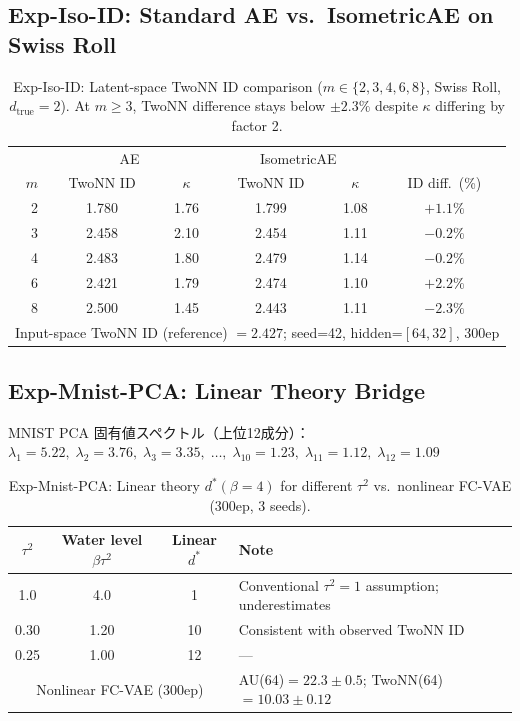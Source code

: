 \documentclass[11pt,a4paper]{jsarticle}
\newcommand{\kap}{\kappa}
\begin{document}
\subsection*{Exp-Iso-ID: Standard AE vs.\ IsometricAE on Swiss Roll}

\begin{table}[H]
\centering
\caption{Exp-Iso-ID: Latent-space TwoNN ID comparison ($m \in \{2,3,4,6,8\}$, Swiss Roll, $d_\mathrm{true}=2$). At $m \geq 3$, TwoNN difference stays below $\pm2.3\%$ despite $\kap$ differing by factor 2.}
\label{tab:iso_id}
\small
\begin{tabular}{r cc | cc | c}
\toprule
 & \multicolumn{2}{c|}{AE} & \multicolumn{2}{c|}{IsometricAE} & \\
$m$ & TwoNN ID & $\kap$ & TwoNN ID & $\kap$ & ID diff.\ (\%) \\
\midrule
2 & 1.780 & 1.76 & 1.799 & 1.08 & $+1.1\%$ \\
3 & 2.458 & 2.10 & 2.454 & 1.11 & $-0.2\%$ \\
4 & 2.483 & 1.80 & 2.479 & 1.14 & $-0.2\%$ \\
6 & 2.421 & 1.79 & 2.474 & 1.10 & $+2.2\%$ \\
8 & 2.500 & 1.45 & 2.443 & 1.11 & $-2.3\%$ \\
\midrule
\multicolumn{6}{l}{Input-space TwoNN ID (reference) $= 2.427$; seed=42, hidden=$[64,32]$, 300ep} \\
\bottomrule
\end{tabular}
\end{table}

\subsection*{Exp-Mnist-PCA: Linear Theory Bridge}

MNIST PCA 固有値スペクトル（上位12成分）：
$\lambda_1=5.22,\; \lambda_2=3.76,\; \lambda_3=3.35,\;\ldots,\;\lambda_{10}=1.23,\; \lambda_{11}=1.12,\; \lambda_{12}=1.09$

\begin{table}[H]
\centering
\caption{Exp-Mnist-PCA: Linear theory $d^*(\beta=4)$ for different $\tau^2$ vs.\ nonlinear FC-VAE (300ep, 3 seeds).}
\label{tab:theory_pred}
\small
\begin{tabular}{ccc|l}
\toprule
$\tau^2$ & Water level $\beta\tau^2$ & Linear $d^*$ & Note \\
\midrule
1.0  & 4.0  & 1   & Conventional $\tau^2=1$ assumption; underestimates \\
0.30 & 1.20 & 10  & Consistent with observed TwoNN ID \\
0.25 & 1.00 & 12  & --- \\
\midrule
\multicolumn{3}{c|}{Nonlinear FC-VAE (300ep)} & AU(64)$=22.3\pm0.5$; TwoNN(64)$=10.03\pm0.12$ \\
\bottomrule
\end{tabular}
\end{table}
\end{document}
